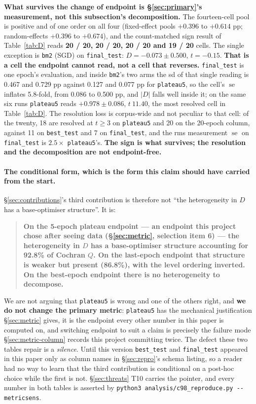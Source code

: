 \documentclass[10pt,letterpaper]{article}
\newcommand{\Dstat}{D}                         %
\newcommand{\plateau}{\texttt{plateau5}}
\newcommand{\arm}[1]{\texttt{#1}}
\DeclareMathOperator{\se}{se}
\begin{document}
\textbf{What survives the change of endpoint is \S\ref{sec:primary}'s measurement, not this
subsection's decomposition.} The fourteen-cell pool is positive and of one order on all four
(fixed-effect pools $+0.396$ to $+0.614$ pp; random-effects $+0.396$ to $+0.674$), and the
count-matched sign result of Table~\ref{tab:D} reads
\textbf{20 / 20, 20 / 20, 20 / 20 and 19 / 20} cells. The single exception is \arm{bm2} (SGD) on
\texttt{final\_test}: $\Dstat = -0.073 \pm 0.500$, $t = -0.15$. \textbf{That is a cell the
endpoint cannot read, not a cell that reverses.} \texttt{final\_test} is one epoch's evaluation,
and inside \arm{bm2}'s two arms the sd of that single reading is 0.467 and 0.729 pp against 0.127
and 0.077 pp for \plateau{}, so the cell's $\se$ inflates 5.8-fold, from 0.086 to 0.500 pp, and
$|\Dstat|$ falls well inside it; on the same six runs \plateau{} reads $+0.978 \pm 0.086$,
$t\ 11.40$, the most resolved cell in Table~\ref{tab:D}. The resolution loss is corpus-wide and
not peculiar to that cell: of the twenty, 18 are resolved at $t \ge 3$ on \plateau{} and 20 on the
20-epoch column, against 11 on \texttt{best\_test} and 7 on \texttt{final\_test}, and the rms
measurement $\se$ on \texttt{final\_test} is $2.5\times$ \plateau{}'s. \textbf{The sign is what
survives; the resolution and the decomposition are not endpoint-free.}

\paragraph{The conditional form, which is the form this claim should have carried from the start.}
\S\ref{sec:contributions}'s third contribution is therefore not ``the heterogeneity in $\Dstat$
has a base-optimiser structure''. It is:

\begin{quote}
\textbf{On the 5-epoch plateau endpoint --- an endpoint this project chose after seeing data
(\S\ref{sec:metric}, selection item 6) --- the heterogeneity in $\Dstat$ has a base-optimiser
structure accounting for 92.8\% of Cochran $Q$. On the last-epoch endpoint that structure is
weaker but present (86.8\%), with the level ordering inverted. On the best-epoch endpoint there
is no heterogeneity to decompose.}
\end{quote}

We are not arguing that \plateau{} is wrong and one of the others right, and \textbf{we do not
change the primary metric}: \plateau{} has the mechanical justification \S\ref{sec:metric} gives,
it is the endpoint every other number in this paper is computed on, and switching endpoint to suit
a claim is precisely the failure mode \S\ref{sec:metric-column} records this project committing
twice. The defect these two tables repair is a \emph{silence}. Until this version
\texttt{best\_test} and \texttt{final\_test} appeared in this paper only as column names in
\S\ref{sec:repro}'s schema listing, so a reader had no way to learn that the third contribution is
conditional on a post-hoc choice while the first is not. \S\ref{sec:threats} T10 carries the
pointer, and every number in both tables is asserted by
\texttt{python3 analysis/c98\_reproduce.py -{}-metricsens}.
\end{document}
